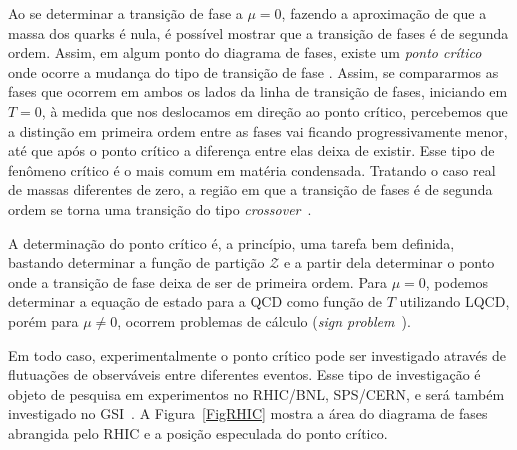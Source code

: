 
Ao se determinar a transição de fase a $\mu = 0$, fazendo a aproximação de que a massa dos quarks é nula, é possível mostrar que a transição de fases é de segunda ordem. Assim, em algum ponto do diagrama de fases, existe um \emph{ponto crítico} onde ocorre a mudança do tipo de transição de fase \parencite{Stephanov2004}. Assim, se compararmos as fases que ocorrem em ambos os lados da linha de transição de fases, iniciando em $T = 0$, à medida que nos deslocamos em direção ao ponto crítico, percebemos que a distinção em primeira ordem entre as fases vai ficando progressivamente menor, até que após o ponto crítico a diferença entre elas deixa de existir. Esse tipo de fenômeno crítico é o mais comum em matéria condensada. Tratando o caso real de massas diferentes de zero, a região em que a transição de fases é de segunda ordem se torna uma transição do tipo \emph{crossover}~\parencite{Stephanov2004}.

A determinação do ponto crítico é, a princípio, uma tarefa bem definida, bastando determinar a função de partição $\mathcal{Z}$ e a partir dela determinar o ponto onde a transição de fase deixa de ser de primeira ordem. Para $\mu = 0$, podemos determinar a equação de estado para a QCD como função de $T$ utilizando LQCD, porém para $\mu \neq 0$, ocorrem problemas de cálculo (\emph{sign problem}~\parencite{Stephanov2004}).


Em todo caso, experimentalmente o ponto crítico pode ser investigado através de flutuações de observáveis entre diferentes eventos. Esse tipo de investigação é objeto de pesquisa em experimentos no RHIC/BNL, SPS/CERN, e será também investigado no GSI~\parencite{Buballa,Stephanov2006}. A Figura~\ref{FigRHIC}\parencite{RHIC} mostra a área do diagrama de fases abrangida pelo RHIC e a posição especulada do ponto crítico.

